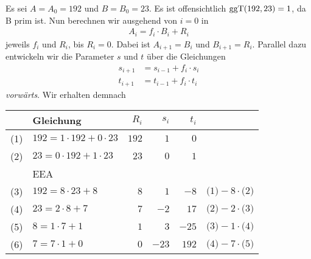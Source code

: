 \begin{beispiel}[EEA]
	Es sei $A = A_0 = 192 $ und $B = B_0 = 23$. Es ist offensichtlich $\operatorname{ggT}(192, 23) = 1$, da B prim ist. Nun berechnen wir ausgehend von $i = 0$ in
	\begin{align*}
		A_i = f_i \cdot B_i + R_i
	\end{align*}
	jeweils $f_i$ und $R_i$, bis $R_i = 0$. Dabei ist $A_{i+1} = B_i$ und $B_{i+1} = R_i$. Parallel dazu entwickeln wir die Parameter $s$ und $t$ über die Gleichungen
	\begin{align*}
		s_{i+1} &= s_{i-1} + f_i \cdot s_{i}\\
		t_{i+1} &= t_{i-1} + f_i \cdot t_{i}
	\end{align*}
	\emph{vorwärts}. Wir erhalten demnach
	\begin{table}[h]
		\centering
		\large
		\begin{tabular}[c]{|c|l|rrr|l|}
			\hline
			& Gleichung & $R_i$ & $s_i$ & $t_i$ &\\
			\hline
			\hline
			(1) & $192 = 1 \cdot 192 + 0 \cdot 23$ & $192$ & $1$ & $0$ &\\
			(2) & $23 = 0 \cdot 192 + 1 \cdot 23$ & $23$ & $0$ & $1$ &\\
			\hline 
			& EEA & & & &\\
			\hline
			(3) & $192 = 8 \cdot 23 + 8$ & $8$ & $1$ & $-8$ & $\text{(1)} - 8 \cdot \text{(2)}$\\
			(4) & $23 =  2 \cdot 8 + 7$ & $7$ & $-2$ & $17$ & $\text{(2)} - 2 \cdot \text{(3)}$\\
			(5) & $8 = 1 \cdot 7 + 1$ & $1$ & $3$ & $-25$ & $\text{(3)} - 1 \cdot \text{(4)}$\\ 
			(6) & $7 = 7 \cdot 1 + 0$ & $0$ & $-23$ & $192$ & $\text{(4)} - 7 \cdot \text{(5)}$\\
			\hline
		\end{tabular}
	\end{table}
	

\end{beispiel}
